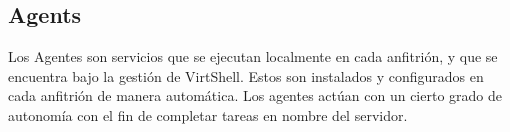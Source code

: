 \subsection{Agents}
Los Agentes son servicios que se ejecutan localmente en cada anfitrión, y que se encuentra bajo la gestión de VirtShell. Estos son instalados y configurados en cada anfitrión de manera automática. Los agentes actúan con un cierto grado de autonomía con el fin de completar tareas en nombre del servidor.\\
